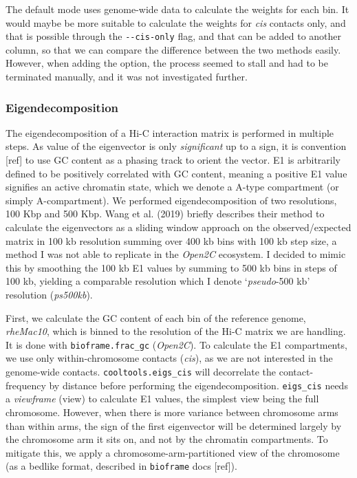 \documentclass[
  11pt,
  a4paper,
]{scrbook}
\let\oldemph\emph
\renewcommand\emph[1]{\oldemph{\color{gray}#1}}
\begin{document}
The default mode uses genome-wide data to calculate the weights for each
bin. It would maybe be more suitable to calculate the weights for
\emph{cis} contacts only, and that is possible through the
\texttt{-\/-cis-only} flag, and that can be added to another column, so
that we can compare the difference between the two methods easily.
However, when adding the option, the process seemed to stall and had to
be terminated manually, and it was not investigated further.

\subsubsection{Eigendecomposition}\label{sec-methods-eigendecomposition}

The eigendecomposition of a Hi-C interaction matrix is performed in
multiple steps. As value of the eigenvector is only \emph{significant}
up to a sign, it is convention {[}ref{]} to use GC content as a phasing
track to orient the vector. E1 is arbitrarily defined to be positively
correlated with GC content, meaning a positive E1 value signifies an
active chromatin state, which we denote a A-type compartment (or simply
A-compartment). We performed eigendecomposition of two resolutions, 100
Kbp and 500 Kbp. Wang et al. (2019) briefly describes their method to
calculate the eigenvectors as a sliding window approach on the
observed/expected matrix in 100 kb resolution summing over 400 kb bins
with 100 kb step size, a method I was not able to replicate in the
\emph{Open2C} ecosystem. I decided to mimic this by smoothing the 100 kb
E1 values by summing to 500 kb bins in steps of 100 kb, yielding a
comparable resolution which I denote `\emph{pseudo}-500 kb' resolution
(\emph{ps500kb}).

First, we calculate the GC content of each bin of the reference genome,
\emph{rheMac10}, which is binned to the resolution of the Hi-C matrix we
are handling. It is done with \texttt{bioframe.frac\_gc}
(\emph{Open2C}). To calculate the E1 compartments, we use only
within-chromosome contacts (\emph{cis}), as we are not interested in the
genome-wide contacts. \texttt{cooltools.eigs\_cis} will decorrelate the
contact-frequency by distance before performing the eigendecomposition.
\texttt{eigs\_cis} needs a \emph{viewframe} (view) to calculate E1
values, the simplest view being the full chromosome. However, when there
is more variance between chromosome arms than within arms, the sign of
the first eigenvector will be determined largely by the chromosome arm
it sits on, and not by the chromatin compartments. To mitigate this, we
apply a chromosome-arm-partitioned view of the chromosome (as a bedlike
format, described in \texttt{bioframe} docs {[}ref{]}).
\end{document}

